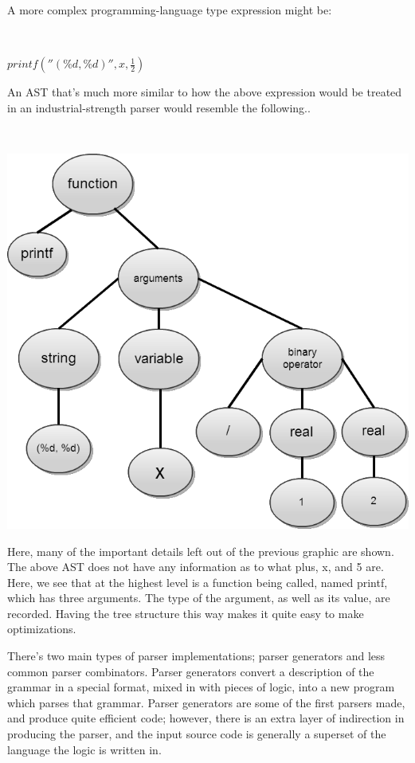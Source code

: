 \documentclass[titlepage]{article}
\begin{document}
			A more complex programming-language type expression might be:
			\newline

			~\centerline{\Large{$printf(''(\%d, \%d)'', x, \frac{1}{2})$}}
			\newline

			An AST that's much more similar to how the above expression would be treated in an industrial-strength parser would resemble the following..
			\newline

			~\centerline{\includegraphics[scale=.5]{ExampleCodeAST.png}}
			\newline

			Here, many of the important details left out of the previous graphic are shown.  The above AST does not have any information as to what plus, x, and 5 are.  Here, we see that at the highest level is a function being called, named printf, which has three arguments.  The type of the argument, as well as its value, are recorded.  Having the tree structure this way makes it quite easy to make optimizations.

			There's two main types of parser implementations; parser generators and less common parser combinators.  Parser generators convert a description of the grammar in a special format, mixed in with pieces of logic, into a new program which parses that grammar.  Parser generators are some of the first parsers made, and produce quite efficient code; however, there is an extra layer of indirection in producing the parser, and the input source code is generally a superset of the language the logic is written in.
\end{document}
